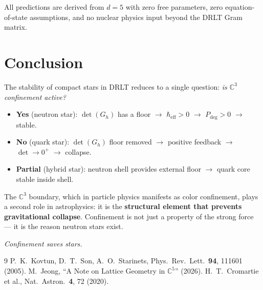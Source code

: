 \documentclass[12pt]{article}
\theoremstyle{definition}
\theoremstyle{remark}
\begin{document}
All predictions are derived from $d = 5$ with zero free parameters, zero equation-of-state assumptions, and no nuclear physics input beyond the DRLT Gram matrix.

\section{Conclusion}

The stability of compact stars in DRLT reduces to a single question: \emph{is $\mathbb{C}^3$ confinement active?}

\begin{itemize}
\item \textbf{Yes} (neutron star): $\det(G_h)$ has a floor $\to$ $\hbar_\text{eff} > 0$ $\to$ $P_\text{deg} > 0$ $\to$ stable.
\item \textbf{No} (quark star): $\det(G_h)$ floor removed $\to$ positive feedback $\to$ $\det \to 0^+$ $\to$ collapse.
\item \textbf{Partial} (hybrid star): neutron shell provides external floor $\to$ quark core stable inside shell.
\end{itemize}

The $\mathbb{C}^3$ boundary, which in particle physics manifests as color confinement, plays a second role in astrophysics: it is the \textbf{structural element that prevents gravitational collapse}. Confinement is not just a property of the strong force --- it is the reason neutron stars exist.

\begin{center}
\emph{Confinement saves stars.}
\end{center}

\begin{thebibliography}{9}
 P.~K.~Kovtun, D.~T.~Son, A.~O.~Starinets, Phys.~Rev.~Lett.\ \textbf{94}, 111601 (2005).
 M.~Jeong, ``A Note on Lattice Geometry in $\mathbb{C}^5$'' (2026).
 H.~T.~Cromartie et al., Nat.~Astron.\ \textbf{4}, 72 (2020).
\end{thebibliography}
\end{document}
